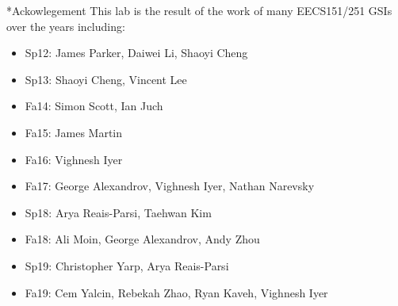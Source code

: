 \documentclass[11pt]{article}
\makeatletter
\renewcommand{\section}
{\@startsection {section}{1}{0pt}
 {-2ex}
 {1ex}
 {\bfseries\Large}}
\makeatother
\begin{document}
\section*{Ackowlegement}
This lab is the result of the work of many EECS151/251 GSIs over the years including:
\begin{itemize}
\item Sp12: James Parker, Daiwei Li, Shaoyi Cheng
\item Sp13: Shaoyi Cheng, Vincent Lee
\item Fa14: Simon Scott, Ian Juch
\item Fa15: James Martin
\item Fa16: Vighnesh Iyer
\item Fa17: George Alexandrov, Vighnesh Iyer, Nathan Narevsky
\item Sp18: Arya Reais-Parsi, Taehwan Kim
\item Fa18: Ali Moin, George Alexandrov, Andy Zhou
\item Sp19: Christopher Yarp, Arya Reais-Parsi
\item Fa19: Cem Yalcin, Rebekah Zhao, Ryan Kaveh, Vighnesh Iyer
\end{itemize}
\end{document}

